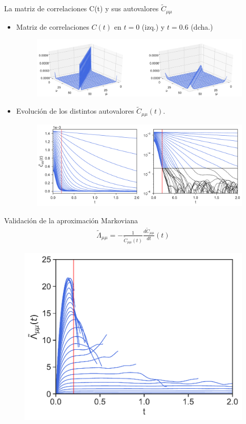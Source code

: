 \documentclass{beamer}
\begin{document}
 \begin{frame}{La matriz de correlaciones C(t) y sus autovalores  $\tilde{C}_{\mu\mu}$}
   \begin{itemize}
 \item<1->
   Matriz de correlaciones $C(t)$ en $t=0$ (izq.) y $t=0.6$ (dcha.)
\begin{figure}[h!]
\includegraphics[width=\linewidth]{Ct-matrix-PBC}
\end{figure}
\item<2->  Evolución de los distintos autovalores $\tilde{C}_{\mu\mu}(t)$. %
\begin{figure}[h!]
  \includegraphics[width=\linewidth]{CtFourier-PBC-exp}
\end{figure}
\end{itemize}
\end{frame}

\begin{frame}{Validación de la aproximación Markoviana}
\begin{align}
  \tilde{\Lambda}_{\mu\mu}=-\frac{1}{\tilde{C}_{\mu\mu}(t)}\frac{d\tilde{C}_{\mu\mu}}{dt}(t)
  \nonumber
\end{align}
\begin{figure}[h!]
\includegraphics[width=0.7\linewidth]{LambdatFourier-PBC-defense}
\end{figure}
\end{frame}
\end{document}
